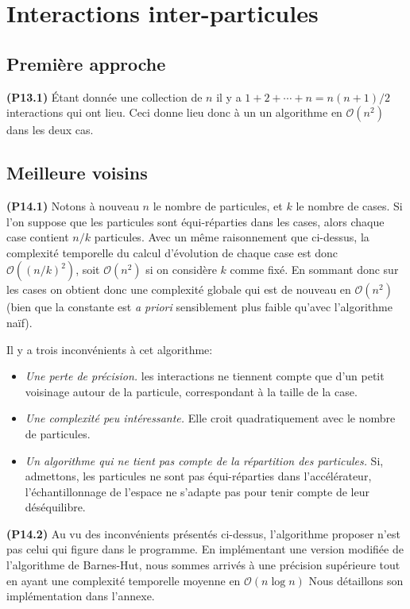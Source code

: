\documentclass[12pt, letterpaper, twoside]{article}
\def\O{\mathcal{O}}
\begin{document}
\section{Interactions inter-particules}
\subsection{Première approche}
\noindent \textbf{(P13.1)} Étant donnée une collection de $n$ il y a $1+2+\cdots+n = n(n+1)/2$ interactions qui ont lieu. Ceci donne lieu donc à un un algorithme en $\O(n^2)$ dans les deux cas.

\subsection{Meilleure voisins}
\noindent \textbf{(P14.1)} Notons à nouveau $n$ le nombre de particules, et $k$ le nombre de cases. Si l'on suppose que les particules sont équi-réparties dans les cases, alors chaque case contient $n/k$ particules. Avec un même raisonnement que ci-dessus, la complexité temporelle du calcul d'évolution de chaque case est donc $\O((n/k)^2)$, soit $\O(n^2)$ si on considère $k$ comme fixé. En sommant donc sur les cases on obtient donc une complexité globale qui est de nouveau en $\O(n^2)$ (bien que la constante est \textit{a priori} sensiblement plus faible qu'avec l'algorithme naïf).

Il y a trois inconvénients à cet algorithme:
\begin{itemize}
	\item \textit{Une perte de précision.} les interactions ne tiennent compte que d'un petit voisinage autour de la particule, correspondant à la taille de la case.
	\item \textit{Une complexité peu intéressante.} Elle croit quadratiquement avec le nombre de particules.
	\item \textit{Un algorithme qui ne tient pas compte de la répartition des particules.} Si, admettons, les particules ne sont pas équi-réparties dans l'accélérateur, l'échantillonnage de l'espace ne s'adapte pas pour tenir compte de leur déséquilibre.
\end{itemize}

\noindent \textbf{(P14.2)} Au vu des inconvénients présentés ci-dessus, l'algorithme proposer n'est pas celui qui figure dans le programme. En implémentant une version modifiée de l'algorithme de Barnes-Hut, nous sommes arrivés à une précision supérieure tout en ayant une complexité temporelle moyenne en $\O(n \log n)$ Nous détaillons son implémentation dans l'annexe.
\end{document}

